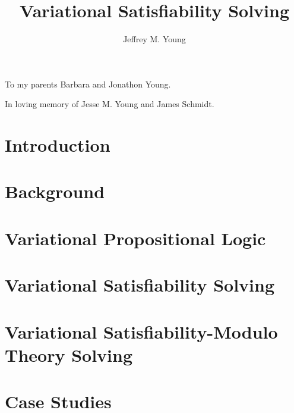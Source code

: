 \documentclass[preprint]{beavtex}
\title{Variational Satisfiability Solving}
\author{Jeffrey M. Young}
\begin{document}
\maketitle

\mainmatter{}

\listoftodos{}

\begin{dedication*}
  To my parents Barbara and Jonathon Young.

  In loving memory of Jesse M. Young and James Schmidt.
\end{dedication*}

\chapter{Introduction}


\chapter{Background}


\chapter{Variational Propositional Logic}


\chapter{Variational Satisfiability Solving}


\chapter{Variational Satisfiability-Modulo Theory Solving}


\chapter{Case Studies}

\end{document}
